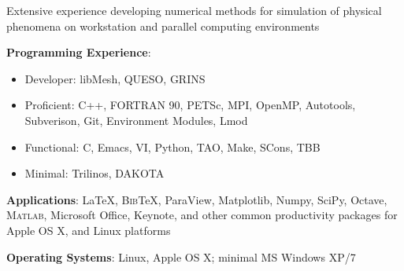 Extensive experience developing numerical methods for simulation of physical phenomena
on workstation and parallel computing environments

\blankline

\textbf{Programming Experience}: 
\begin{itemize}
\itemsep 0pt
\item Developer: libMesh, QUESO, GRINS
\item Proficient: C++, FORTRAN 90, PETSc, MPI, OpenMP, Autotools, Subverison, Git, Environment Modules, Lmod
\item Functional: C, Emacs, VI, Python, TAO, Make, SCons, TBB
\item Minimal: Trilinos, DAKOTA
\end{itemize}

\blankline

\textbf{Applications}: \LaTeX{}, B\textsc{ib}\TeX{}, ParaView, Matplotlib, Numpy, SciPy, Octave,
\textsc{Matlab}, Microsoft Office, 
Keynote, and other common productivity packages for Apple OS X, and Linux platforms
	
\blankline

\textbf{Operating Systems}: Linux, Apple OS X; minimal MS Windows XP/7
